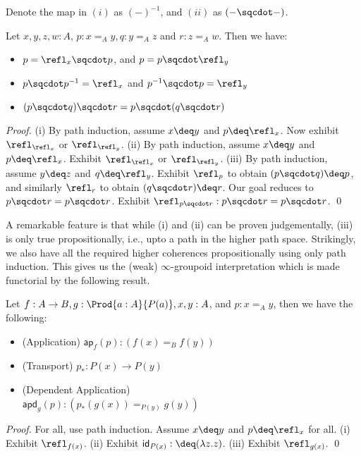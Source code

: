 Denote the map in $(i)$ as $(-)^{-1}$, and $(ii)$ as $(- \sqcdot -)$. 

\begin{proposition} Let $x, y, z, w : A$, $p : x =_A y, q : y =_A z$ and $r : z =_A w$. Then we have:
  \begin{itemize}
    \item [(i)] $p = \refl_x \sqcdot p$, and $p = p \sqcdot \refl_y$
    \item [(ii)] $p \sqcdot p^{-1} = \refl_x$ and $p^{-1} \sqcdot p = \refl_y$
    \item [(iii)] $(p \sqcdot q) \sqcdot r = p \sqcdot (q \sqcdot r)$ 
   \end{itemize} 
\end{proposition}
\textit{Proof.} (i) By path induction, assume $x \deq y$ and $p \deq \refl_x$. Now exhibit $\refl_{\refl_x}$ or $\refl_{\refl_y}$.
(ii) By path induction, assume $x \deq y$ and $p \deq \refl_x$. Exhibit $\refl_{\refl_x}$ or $\refl_{\refl_y}$.
(iii) By path induction, assume $y \deq z$ and $q \deq \refl_y$. Exhibit $\refl_p$ to obtain $(p \sqcdot q) \deq  p$,
and similarly $\refl_r$ to obtain $(q \sqcdot r) \deq r$. Our goal reduces to $p \sqcdot r = p \sqcdot r$.
Exhibit $\refl_{p \sqcdot r} : p \sqcdot r = p \sqcdot r$.
\qed

A remarkable feature is that while (i) and (ii) can be proven judgementally, (iii) is only true propositionally,
i.e., upto a path in the higher path space.
Strikingly, we also have all the required higher coherences propositionally using only path induction.
This gives us the (weak) $\infty$-groupoid interpretation which is made functorial by the following result.

\begin{proposition}
Let $f : A \to B, g : \Prod{a:A}{P(a)}, x, y : A$, and $p : x =_A y$, then we have the following: 
  \begin{itemize}
    \item [(i)] (Application) $\mathsf{ap}_f(p) : (f(x) =_B f(y))$
    \item [(ii)] (Transport) $p_* : P(x) \to P(y)$ 
    \item [(iii)] (Dependent Application) \\ $\mathsf{apd}_g(p) : (p_*(g(x)) =_{P(y)} g(y))$ 
  \end{itemize}
\end{proposition}
\textit{Proof.} For all, use path induction. Assume $x \deq y$ and $p \deq \refl_x$ for all.
(i) Exhibit $\refl_{f(x)}$.
(ii) Exhibit $\mathsf{id}_{P(x)} :\deq (\lambda z.z)$.
(iii) Exhibit $\refl_{g(x)}$.
\qed


